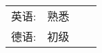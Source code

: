 %
%


\begin{tabular}{lrll}
	\textsc{英语:} & \textsc{熟悉} \\
	\textsc{德语:} & \textsc{初级} \\
\end{tabular}
